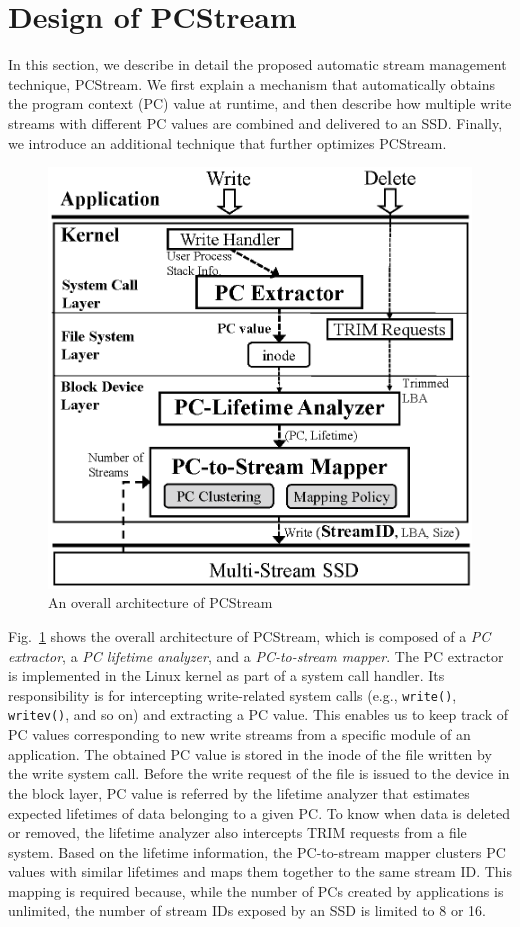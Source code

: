 \section{Design of PCStream}
In this section, we describe in detail the proposed automatic stream management
technique, {\sf PCStream}.  We first explain a mechanism that automatically
obtains the program context (PC) value at runtime, and then describe how
multiple write streams with different PC values are combined and delivered to
an SSD. Finally, we introduce an additional technique that further optimizes
{\sf PCStream}.

\begin{figure}[b]
	\vspace{-15pt}
	\centering
	\includegraphics[width=0.8\linewidth]{figure/architecture3}
	\vspace{-10pt}
	\caption{An overall architecture of {\sf PCStream}}
	\label{fig:architecture}
\end{figure}

Fig.~\ref{fig:architecture} shows the overall architecture of {\sf PCStream}, which
is composed of a \textit{PC extractor}, a \textit{PC lifetime analyzer}, and a
\textit{PC-to-stream mapper}.  The PC extractor is implemented in the Linux
kernel as part of a system call handler. Its responsibility is for intercepting
write-related system calls (e.g., \texttt{write()}, \texttt{writev()}, and so
on) and extracting a PC value.  This enables us to keep track of PC values
corresponding to new write streams from a specific module of an application. 
The obtained PC value is stored in the inode of the file written by the write system call.
Before the write request of the file is issued to the device in the block layer, 
PC value is referred 
by the lifetime analyzer that estimates expected
lifetimes of data belonging to a given PC. To know when data is deleted or
removed, the lifetime analyzer also intercepts TRIM requests from a file
system.  Based on the lifetime information, the PC-to-stream mapper clusters PC
values with similar lifetimes and maps them together to the same stream ID.
This mapping is required because, while the number of PCs created by applications is unlimited, the
number of stream IDs exposed by an SSD is limited to 8 or 16.


